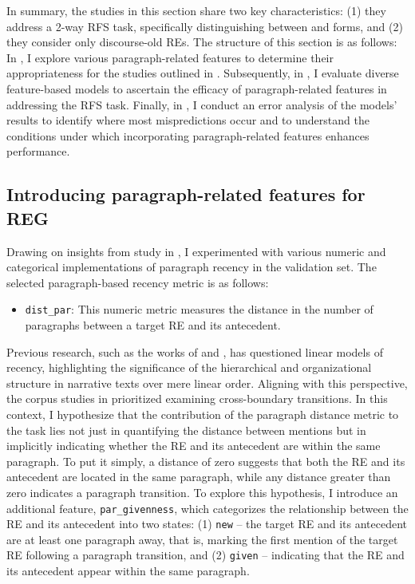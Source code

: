 In summary, the studies in this section share two key characteristics: (1) they address a 2-way RFS task, specifically distinguishing between  and  forms, and (2) they consider only discourse-old REs. The structure of this section is as follows: In , I explore various paragraph-related features to determine their appropriateness for the studies outlined in . Subsequently, in , I evaluate diverse feature-based models to ascertain the efficacy of paragraph-related features in addressing the \context RFS task. Finally, in , I conduct an error analysis of the models' results to identify where most mispredictions occur and to understand the conditions under which incorporating paragraph-related features enhances performance.

\subsection{Introducing paragraph-related features for REG}\label{subsec:featintro}

Drawing on insights from study \studC in , I experimented with various numeric and categorical implementations of paragraph recency in the validation set. The selected paragraph-based recency metric is as follows:

\begin{itemize}
	\item \texttt{dist\_par}: This numeric metric measures the distance in the number of paragraphs between a target RE and its antecedent.
\end{itemize}


Previous research, such as the works of \citet{Tomlin1987cognitive} and \citet{fox1987anaphora}, has questioned linear models of recency, highlighting the significance of the hierarchical and organizational structure in narrative texts over mere linear order. Aligning with this perspective, the corpus studies in  prioritized examining cross-boundary transitions. In this context, I hypothesize that the contribution of the paragraph distance metric to the \context task lies not just in quantifying the distance between mentions but in implicitly indicating whether the RE and its antecedent are within the same paragraph. To put it simply, a distance of zero suggests that both the RE and its antecedent are located in the same paragraph, while any distance greater than zero indicates a paragraph transition. To explore this hypothesis, I introduce an additional feature, \texttt{par\_givenness}, which categorizes the relationship between the RE and its antecedent into two states: (1) \texttt{new} -- the target RE and its antecedent are at least one paragraph away, that is, marking the first mention of the target RE following a paragraph transition, and (2) \texttt{given} -- indicating that the RE and its antecedent appear within the same paragraph.

